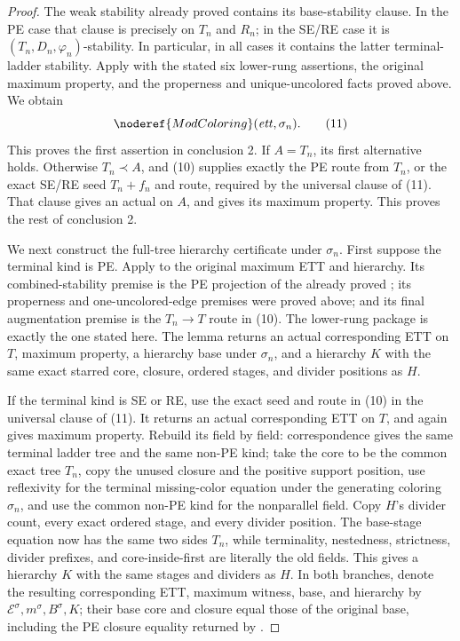 \begin{proof}
The weak stability already proved contains its base-stability clause.
In the PE case that clause is precisely
 on $T_n$ and $R_n$; in the SE/RE case
it is $(T_n,D_n,\varphi_n)$-stability.  In particular, in all cases it
contains the latter terminal-ladder stability.  Apply  with
the stated six lower-rung assertions, the original maximum property, and
the properness and unique-uncolored facts proved above.  We obtain
\[
                      \noderef{ModColoring}(\mathit{ett},\sigma_n). \tag{11}
\]
This proves the first assertion in conclusion 2.  If $A=T_n$, its first
alternative holds.  Otherwise $T_n\prec A$, and (10) supplies exactly the
PE route from $T_n$, or the exact SE/RE seed $T_n+f_n$ and route, required
by the universal clause of (11).  That clause gives an actual
 on $A$, and
 gives its maximum property.  This
proves the rest of conclusion 2.

We next construct the full-tree hierarchy certificate under $\sigma_n$.
First suppose the terminal kind is PE.  Apply
 to the original maximum ETT and hierarchy.
Its combined-stability premise is the PE projection of the already proved
; its properness and one-uncolored-edge
premises were proved above; and its final augmentation premise is the
$T_n\longrightarrow T$ route in (10).  The lower-rung package is exactly
the one stated here.  The lemma returns an actual corresponding ETT on
$T$, maximum property, a hierarchy base under $\sigma_n$, and a hierarchy
$K$ with the same exact starred core, closure, ordered stages, and divider
positions as $H$.

If the terminal kind is SE or RE, use the exact seed and route in (10) in
the universal clause of (11).  It returns an actual corresponding ETT on
$T$, and  again gives maximum property.
Rebuild its  field by field: correspondence gives
the same terminal ladder tree and the same non-PE kind; take the core to
be the common exact tree $T_n$, copy the unused closure and the positive
support position, use reflexivity for the terminal missing-color equation
under the generating coloring $\sigma_n$, and use the common non-PE kind
for the nonparallel field.  Copy $H$'s divider count, every exact ordered
stage, and every divider position.  The base-stage equation now has the
same two sides $T_n$, while terminality, nestedness, strictness, divider
prefixes, and core-inside-first are literally the old fields.  This gives
a hierarchy $K$ with the same stages and dividers as $H$.  In both
branches, denote the resulting corresponding ETT, maximum witness, base,
and hierarchy by $\mathcal E^\sigma,m^\sigma,B^\sigma,K$; their base core
and closure equal those of the original base, including the PE closure
equality returned by .               


\end{proof}
